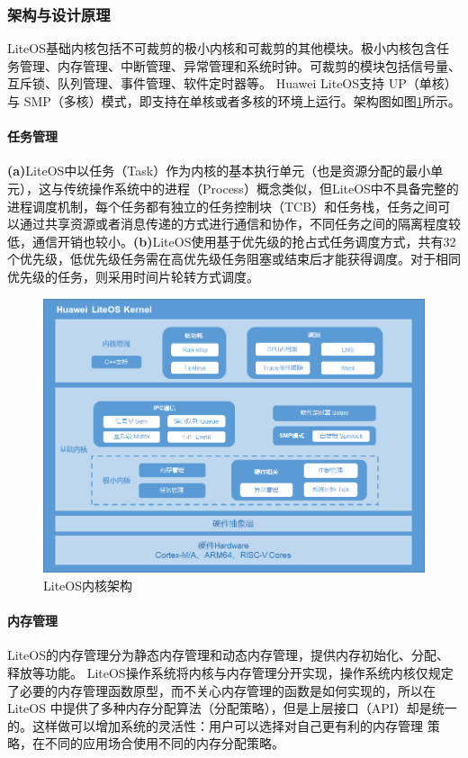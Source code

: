 \documentclass{article}
\begin{document}
\subsubsection{架构与设计原理}
LiteOS基础内核包括不可裁剪的极小内核和可裁剪的其他模块。极小内核包含任务管理、内存管理、中断管理、异常管理和系统时钟。可裁剪的模块包括信号量、互斥锁、队列管理、事件管理、软件定时器等。 Huawei LiteOS支持 UP（单核）与 SMP（多核）模式，即支持在单核或者多核的环境上运行。架构图如图\ref{fig:1}所示。

\paragraph{任务管理} \textbf{(a)}LiteOS中以任务（Task）作为内核的基本执行单元（也是资源分配的最小单元），这与传统操作系统中的进程（Process）概念类似，但LiteOS中不具备完整的进程调度机制，每个任务都有独立的任务控制块（TCB）和任务栈，任务之间可以通过共享资源或者消息传递的方式进行通信和协作，不同任务之间的隔离程度较低，通信开销也较小。\textbf{(b)}LiteOS使用基于优先级的抢占式任务调度方式，共有32个优先级，低优先级任务需在高优先级任务阻塞或结束后才能获得调度。对于相同优先级的任务，则采用时间片轮转方式调度。
\begin{figure}[htbp]
    \centering
    \includegraphics[width = \textwidth]{figs/LiteOS_Kernel_Arch.png}
    \caption{LiteOS内核架构}
    \label{fig:1}
\end{figure}
\paragraph{内存管理} LiteOS的内存管理分为静态内存管理和动态内存管理，提供内存初始化、分配、释放等功能。 LiteOS操作系统将内核与内存管理分开实现，操作系统内核仅规定了必要的内存管理函数原型，而不关心内存管理的函数是如何实现的，所以在LiteOS 中提供了多种内存分配算法（分配策略），但是上层接口（API）却是统一的。这样做可以增加系统的灵活性：用户可以选择对自己更有利的内存管理 策略，在不同的应用场合使用不同的内存分配策略\supercite{ref11}。
\end{document}
